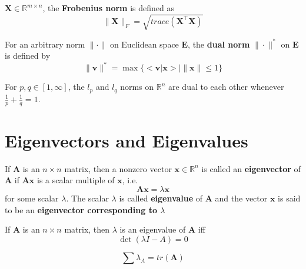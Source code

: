 				\begin{definition}
					$\mathbf{X} \in \mathbb{R}^{m \times n}$, the \textbf{Frobenius norm} is defined as
					\begin{equation}
						\|\mathbf{X}\|_F = \sqrt{trace(\mathbf{X}^\top \mathbf{X})}
					\end{equation}
				\end{definition}

				\begin{definition}
					For an arbitrary norm $\|\cdot\|$ on Euclidean space $\mathbf{E}$, the \textbf{dual norm} $\|\cdot\|^*$ on $\mathbf{E}$ is defined by
					\begin{equation}
						\|\mathbf{v}\|^* = \max \{<\mathbf{v}|\mathbf{x}>|\|\mathbf{x}\| \le 1\}
					\end{equation}
				\end{definition}

				For $p, q \in [1, \infty]$, the $l_p$ and $l_q$ norms on $\mathbb{R}^n$ are dual to each other whenever $\frac1p + \frac1q = 1$.

			\section{Eigenvectors and Eigenvalues}
				\begin{definition}
					If $\mathbf{A}$ is an $n \times n$ matrix, then a nonzero vector $\mathbf{x} \in \mathbb{R}^n$ is called an \textbf{eigenvector} of $\mathbf{A}$ if $\mathbf{Ax}$ is a scalar multiple of $\mathbf{x}$, i.e.
					\begin{equation}
						\mathbf{Ax} = \lambda \mathbf{x}
					\end{equation}
					for some scalar $\lambda$. The scalar $\lambda$ is called \textbf{eigenvalue} of $\mathbf{A}$ and the vector $\mathbf{x}$ is said to be an \textbf{eigenvector corresponding to $\lambda$}
				\end{definition}

				\begin{theorem}
					If $\mathbf{A}$ is an $n \times n$ matrix, then $\lambda$ is an eigenvalue of $\mathbf{A}$ iff
					\begin{equation}
						\det(\lambda I - A) = 0
					\end{equation}
				\end{theorem}

				\begin{corollary}
					\begin{equation}
						\sum \lambda_A = tr(\mathbf{A})
					\end{equation}
				\end{corollary}


